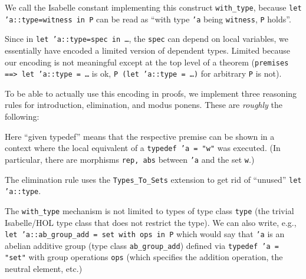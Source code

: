 \documentclass[11pt,a4paper]{article}
\begin{document}
We call the Isabelle constant implementing this construct \texttt{with\_type}, because \texttt{let 'a::type=witness in P} can be read as ``with type \texttt{'a} being \texttt{witness}, \texttt{P} holds''.

Since in \texttt{let 'a::type=spec in \dots}, the \texttt{spec} can depend on local variables,
we essentially have encoded a limited version of dependent types.
Limited because our encoding is not meaningful except at the top level of a theorem (\texttt{premises ==> let 'a::type = \dots} is ok, \texttt{P (let 'a::type = \dots)} for arbitrary \texttt{P} is not).

To be able to actually use this encoding in proofs, we implement three reasoning rules for introduction, elimination, and modus ponens.
These are \emph{roughly} the following:
\begin{center}\strut
  \qquad\qquad

  \bigskip
  
\strut{}
\end{center}
Here ``given typedef'' means that the respective premise can be shown in a context where
the local equivalent of a \texttt{typedef 'a = "w"} was executed.
(In particular, there are morphisms \texttt{rep, abs} between \texttt{'a} and the set \texttt{w}.)

The elimination rule uses the \texttt{Types\_To\_Sets} extension \cite{types-to-sets} to get rid of ``unused'' \texttt{let 'a::type}.

\bigskip

The \texttt{with\_type} mechanism is not limited to types of type class \texttt{type}
(the trivial Isabelle/HOL type class that does not restrict the type).
We can also write, e.g., \texttt{let 'a::ab\_group\_add = set with ops in P} which would say that \texttt{'a} is an abelian additive group (type class \texttt{ab\_group\_add}) defined via \texttt{typedef 'a = "set"} with group operations \texttt{ops} (which specifies the addition operation, the neutral element, etc.)






\end{document}
